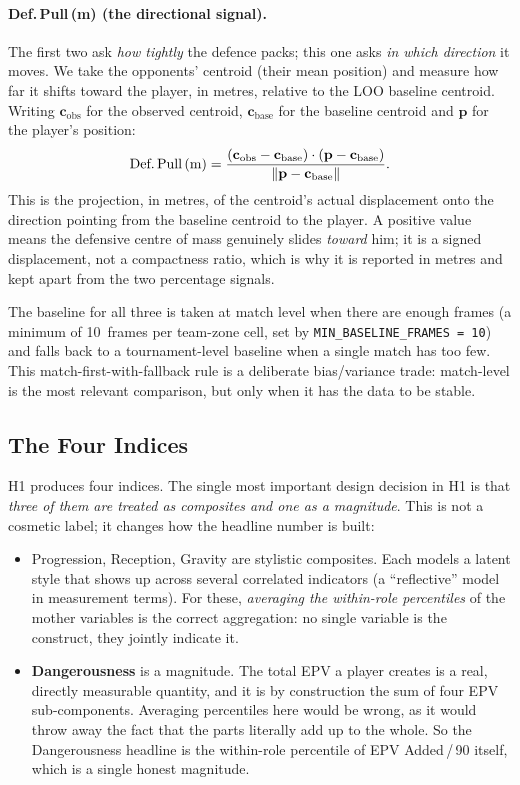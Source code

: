 \documentclass[12pt,a4paper]{article}
\begin{document}
\paragraph{Def.\,Pull\,(m) (the directional signal).}
The first two ask \emph{how tightly} the defence packs; this one asks \emph{in which direction} it moves. We take the opponents' centroid (their mean position) and measure how far it shifts toward the player, in metres, relative to the LOO baseline centroid. Writing $\mathbf{c}_{\text{obs}}$ for the observed centroid, $\mathbf{c}_{\text{base}}$ for the baseline centroid and $\mathbf{p}$ for the player's position:
\begin{equation}\label{eq:gravity-dir}
    \text{Def.\,Pull\,(m)} = \frac{(\mathbf{c}_{\text{obs}} - \mathbf{c}_{\text{base}}) \cdot (\mathbf{p} - \mathbf{c}_{\text{base}})}{\lVert \mathbf{p} - \mathbf{c}_{\text{base}} \rVert}.
\end{equation}
This is the projection, in metres, of the centroid's actual displacement onto the direction pointing from the baseline centroid to the player. A positive value means the defensive centre of mass genuinely slides \emph{toward} him; it is a signed displacement, not a compactness ratio, which is why it is reported in metres and kept apart from the two percentage signals.

The baseline for all three is taken at match level when there are enough frames (a minimum of 10~frames per team-zone cell, set by \texttt{MIN\_BASELINE\_FRAMES\,=\,10}) and falls back to a tournament-level baseline when a single match has too few.
This match-first-with-fallback rule is a deliberate bias/variance trade: match-level is the most relevant comparison, but only when it has the data to be stable.

\subsection{The Four Indices}\label{sec:h1-indices}

H1 produces four indices.
The single most important design decision in H1 is that \emph{three of them are treated as composites and one as a magnitude}. This is not a cosmetic label; it changes how the headline number is built:

\begin{itemize}
    \item Progression, Reception, Gravity are stylistic composites. Each models a latent style that shows up across several correlated indicators (a ``reflective'' model in measurement terms). For these, \emph{averaging the within-role percentiles} of the mother variables is the correct aggregation: no single variable is the construct, they jointly indicate it.
    \item \textbf{Dangerousness} is a magnitude. The total EPV a player creates is a real, directly measurable quantity, and it is by construction the sum of four EPV sub-components. Averaging percentiles here would be wrong, as it would throw away the fact that the parts literally add up to the whole. So the Dangerousness headline is the within-role percentile of EPV Added\,/\,90 itself, which is a single honest magnitude.
\end{itemize}
\end{document}
